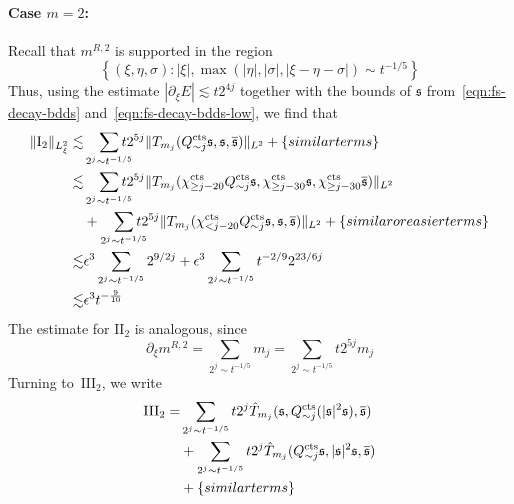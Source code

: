 \documentclass[letterpaper, reqno,final]{amsart}
\newcommand{\fs}{\mathfrak{s}}
\newcommand{\rmI}{\mathrm{I}}
\newcommand{\rmII}{\mathrm{II}}
\newcommand{\rmIII}{\mathrm{III}}
\newcommand{\tcts}{\text{cts}}
\newcommand{\btext}[1]{\left\{\textup{#1}\right\}}
\newcommand{\bsim}{\btext{similar terms}}
\newcommand{\bsime}{\btext{similar or easier terms}}
\begin{document}
\paragraph{\textbf{Case $m=2$}:} Recall that $m^{R,2}$ is supported in the region
\begin{equation}\label{eqn:m-R-2-supp-cond}
    \left\{(\xi,\eta,\sigma) : |\xi|, \max(|\eta|, |\sigma|, |\xi - \eta - \sigma|)  \sim t^{-1/5} \right\}
\end{equation}
Thus, using the estimate $|\partial_\xi E| \lesssim t 2^{4j}$ together with the bounds of $\fs$ from~\eqref{eqn:fs-decay-bdds} and~\eqref{eqn:fs-decay-bdds-low}, we find that
\begin{equation*}\begin{split}
    \lVert \rmI_2 \rVert_{L^2_\xi} \lesssim& \smashoperator[r]{\sum_{2^j \sim t^{-1/5}}}t 2^{5j} \lVert T_{m_j}(Q_{\sim j}^\tcts \fs, \fs, \overline{\fs})\rVert_{L^2} + \bsim\\
    \lesssim& \smashoperator[r]{\sum_{2^j \sim t^{-1/5}}}t 2^{5j} \lVert T_{m_j}(\chi^\tcts_{\geq j - 20}Q_{\sim j}^\tcts \fs, \chi^\tcts_{\geq j - 30}\fs, \chi^\tcts_{\geq j - 30}\overline{\fs})\rVert_{L^2}\\
    &+ \smashoperator[r]{\sum_{2^j \sim t^{-1/5}}}t 2^{5j} \lVert T_{m_j}(\chi^\tcts_{< j - 20}Q_{\sim j}^\tcts \fs, \fs, \overline{\fs})\rVert_{L^2} + \bsime\\
    \lesssim& \epsilon^3 \sum_{2^j \sim t^{-1/5}} 2^{9/2j} + \epsilon^3 \sum_{2^j \sim t^{-1/5}} t^{-2/9} 2^{23/6 j}\\
    \lesssim& \epsilon^3 t^{-\frac{9}{10}}
\end{split}
\end{equation*}
The estimate for $\rmII_2$ is analogous, since
\begin{equation*}
    \partial_\xi m^{R,2} = \sum_{2^j \sim t^{-1/5}} m_j = \sum_{2^j \sim t^{-1/5}} t 2^{5j} m_j
\end{equation*}
Turning to~$\rmIII_2$, we write
\begin{subequations}\begin{align}
    \rmIII_2 =& \sum_{2^j \sim t^{-1/5}} t2^j \hat{T}_{m_j}(\fs, Q_{\sim j}^\tcts (|\fs|^2\fs), \overline{\fs})\label{eqn:III-2-a}\\
    &+ \sum_{2^j \sim t^{-1/5}} t2^j \hat{T}_{m_j}(Q_{\sim j}^\tcts\fs, |\fs|^2\fs, \overline{\fs})\label{eqn:III-2-b}\\
    &+\bsim \notag
\end{align}
\end{subequations}
\end{document}
